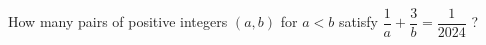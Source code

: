How many pairs of positive integers $(a, b)$ for $a < b$ satisfy $\dfrac{1}{a} + \dfrac{3}{b} = \dfrac{1}{2024}$ ?
